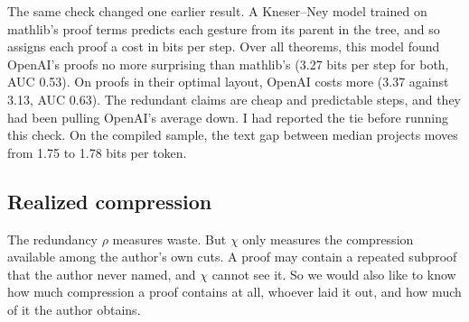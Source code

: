 \documentclass{article}
\begin{document}
The same check changed one earlier result. A Kneser--Ney model trained on mathlib's proof terms predicts each gesture
from its parent in the tree, and so assigns each proof a cost in bits per step. Over all theorems, this model found
OpenAI's proofs no more surprising than mathlib's (3.27 bits per step for both, AUC 0.53). On proofs in their optimal layout,
OpenAI costs more (3.37 against 3.13, AUC 0.63). The redundant claims are cheap and predictable steps, and they had
been pulling OpenAI's average down. I had reported the tie before running this check. On the compiled sample, the text gap between median projects moves from 1.75 to 1.78 bits per token.

\subsection{Realized compression}

The redundancy $\rho$ measures waste. But $\chi$ only measures the compression available among the author's own cuts.
A proof may contain a repeated subproof that the author never named, and $\chi$ cannot see it. So we would also like to
know how much compression a proof contains at all, whoever laid it out, and how much of it the author obtains.
\end{document}
